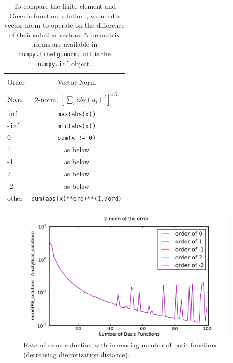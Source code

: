 \documentclass[10pt]{article}
\begin{document}
\begin{table}
    \centering
    \label{table:norms}
    \begin{tabular}{lc}
        \hline \\
        Order  & Vector Norm \\
        \hline \\
        None   & 2-norm, $[\sum_{i} abs(a_{i})^2]^{1/2}$ \\
        \texttt{inf}    &  \texttt{max(abs(x))} \\
        -\texttt{inf}   &  \texttt{min(abs(x))} \\
        0      &  \texttt{sum(x != 0)} \\
        1      &  as below \\
        -1     &  as below \\
        2      &  as below \\
        -2     &  as below \\
        other  & \texttt{sum(abs(x)**ord)**(1./ord)} \\
        \hline \\
    \end{tabular} 
    \caption{To compare the finite element and Green's function solutions, we need a vector norm to operate on the difference of their solution vectors. Nine matrix norms are available in \texttt{numpy.linalg.norm}. \texttt{inf} is the \texttt{numpy.inf} object.}
\end{table}

\begin{figure}[ht]
    \centering
    \includegraphics[width=\columnwidth,keepaspectratio=true]{./hw7-error_rate-mult_orders.pdf}
    \caption{Rate of error reduction with increasing number of basis functions (decreasing discretization distance).}
    \label{fig:errorrate}
\end{figure}
\end{document}
